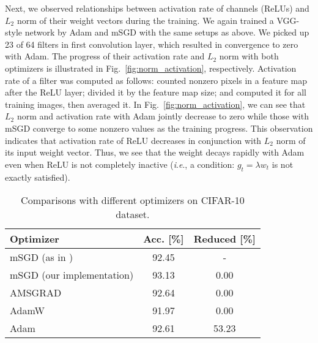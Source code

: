 \documentclass[conference]{IEEEtran}
\newcommand{\ie}{\textit{i}.\textit{e}.}
\begin{document}
Next, we observed relationships between activation rate of channels (ReLUs) and $L_2$ norm of their weight vectors during the training. 
We again trained a VGG-style network by Adam and mSGD with the same setups as above.
We picked up 23 of 64 filters in first convolution layer, which resulted in convergence to zero with Adam.
The progress of their activation rate and $L_2$ norm with both optimizers is illustrated in Fig.~\ref{fig:norm_activation}, respectively. 
Activation rate of a filter was computed as follows: 
counted nonzero pixels in a feature map after the ReLU layer; 
divided it by the feature map size; and 
computed it for all training images, then averaged it.
In Fig.~\ref{fig:norm_activation}, we can see that $L_2$ norm and activation rate with Adam jointly decrease to zero while those with mSGD converge to some nonzero values as the training progress. 
This observation indicates that activation rate of ReLU decreases in conjunction with $L_2$ norm of its input weight vector. 
Thus, we see that the weight decays rapidly with Adam even when ReLU is not completely inactive (\ie, a condition: $g_t = \lambda w_t$ is not exactly satisfied). 

\begin{table}[t]
\begin{center}
	\caption{Comparisons with different optimizers on CIFAR-10 dataset.}
	\begin{tabular}{l|cc} \hline
	Optimizer					&	Acc. [\%]	&	Reduced [\%]	\\ \hline
	mSGD (as in \cite{github})	&	92.45		&	-				\\
	mSGD (our implementation)	&	93.13		&	0.00			\\
	AMSGRAD 					&	92.64		&	0.00			\\
	AdamW 						&	91.97		&	0.00			\\
	Adam 						&	92.61		&	53.23			\\ \hline
	\end{tabular}
	\label{tbl:opt_cifar}
\end{center}
\end{table}
\end{document}
